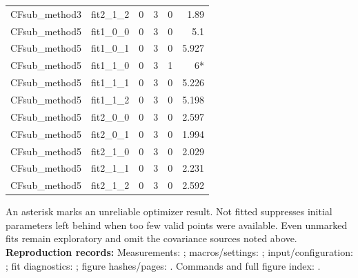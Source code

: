 \documentclass[11pt,a4paper]{article}
\begin{document}
{\begin{longtable}{llrrrr}
CFsub\_method3 & fit2\_1\_2 & 0 & 3 & 0 & 1.89\\
CFsub\_method5 & fit1\_0\_0 & 0 & 3 & 0 & 5.1\\
CFsub\_method5 & fit1\_0\_1 & 0 & 3 & 0 & 5.927\\
CFsub\_method5 & fit1\_1\_0 & 0 & 3 & 1 & 6*\\
CFsub\_method5 & fit1\_1\_1 & 0 & 3 & 0 & 5.226\\
CFsub\_method5 & fit1\_1\_2 & 0 & 3 & 0 & 5.198\\
CFsub\_method5 & fit2\_0\_0 & 0 & 3 & 0 & 2.597\\
CFsub\_method5 & fit2\_0\_1 & 0 & 3 & 0 & 1.994\\
CFsub\_method5 & fit2\_1\_0 & 0 & 3 & 0 & 2.029\\
CFsub\_method5 & fit2\_1\_1 & 0 & 3 & 0 & 2.231\\
CFsub\_method5 & fit2\_1\_2 & 0 & 3 & 0 & 2.592\\
\hline\end{longtable}}
An asterisk marks an unreliable optimizer result. Not fitted suppresses initial parameters left behind when too few valid points were available. Even unmarked fits remain exploratory and omit the covariance sources noted above.
{\small\textbf{Reproduction records:} Measurements: ; macros/settings: ; input/configuration: ; fit diagnostics: ; figure hashes/pages: . Commands and full figure index: .}
\end{document}
